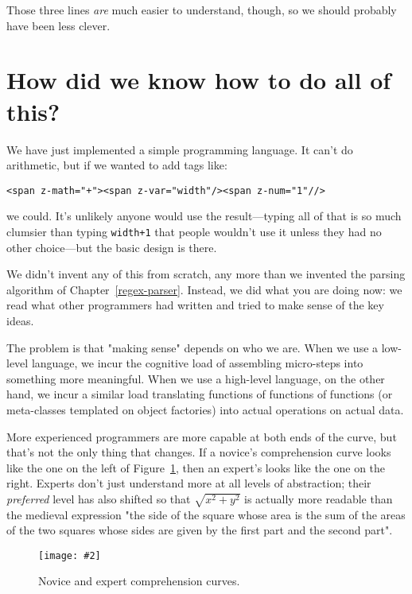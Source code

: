 \documentclass[krantzl]{krantz}
\newcommand{\figpdf}[4]{\begin{figure}%
\centering%
\texttt{[image: \#2]}%
\caption{#3}%
\label{#1}%
\end{figure}}
\newcommand{\chapref}[1]{Chapter~\ref{#1}}
\newcommand{\figref}[1]{Figure~\ref{#1}}
\begin{document}
\noindent Those three lines \emph{are} much easier to understand, though,
so we should probably have been less clever.

\section{How did we know how to do all of this?}\label{page-templates-learning}


We have just implemented a simple programming language.
It can't do arithmetic,
but if we wanted to add tags like:

\begin{lstlisting}[frame=single,frameround=tttt]
<span z-math="+"><span z-var="width"/><span z-num="1"//>
\end{lstlisting}


\noindent we could.
It's unlikely anyone would use the result---typing all of that
is so much clumsier than typing \texttt{width+1} that people wouldn't use it
unless they had no other choice---but the basic design is there.


We didn't invent any of this from scratch,
any more than we invented the parsing algorithm of \chapref{regex-parser}.
Instead,
we did what you are doing now:
we read what other programmers had written
and tried to make sense of the key ideas.


The problem is that "making sense" depends on who we are.
When we use a low-level language,
we incur the cognitive load of assembling micro-steps into something more meaningful.
When we use a high-level language,
on the other hand,
we incur a similar load translating functions of functions of functions
(or meta-classes templated on object factories)
into actual operations on actual data.


More experienced programmers are more capable at both ends of the curve,
but that's not the only thing that changes.
If a novice's comprehension curve looks like the one on the left
of \figref{page-templates-comprehension},
then an expert's looks like the one on the right.
Experts don't just understand more at all levels of abstraction;
their \emph{preferred} level has also shifted
so that $\sqrt{x^2 + y^2}$
is actually more readable than the medieval expression
"the side of the square whose area is the sum of the areas of the two squares
whose sides are given by the first part and the second part".

\figpdf{page-templates-comprehension}{./page-templates/comprehension.pdf}{Novice and expert comprehension curves.}{0.6}
\end{document}
